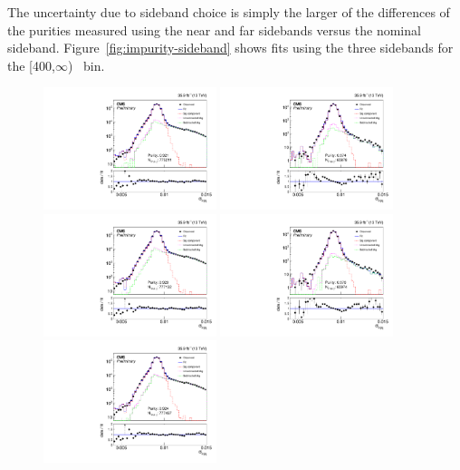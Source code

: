 The uncertainty due to sideband choice is simply the larger of the differences of the purities measured using the near and far sidebands versus the nominal sideband. 
Figure~\ref{fig:impurity-sideband} shows fits using the three sidebands for the [400,$\infty$) \pt\ bin.

\begin{figure}[htbp]
  \centering
  \includegraphics[width=0.45\textwidth]{Calibration/Figures/pvsf/ssfit_175_medium_near_logy.pdf}
  \includegraphics[width=0.45\textwidth]{Calibration/Figures/pvsf/ssfit_400_medium_near_logy.pdf}
  \includegraphics[width=0.45\textwidth]{Calibration/Figures/pvsf/ssfit_175_medium_nominal_logy.pdf}
  \includegraphics[width=0.45\textwidth]{Calibration/Figures/pvsf/ssfit_400_medium_nominal_logy.pdf}
  \includegraphics[width=0.45\textwidth]{Calibration/Figures/pvsf/ssfit_175_medium_far_logy.pdf}

\end{figure}
